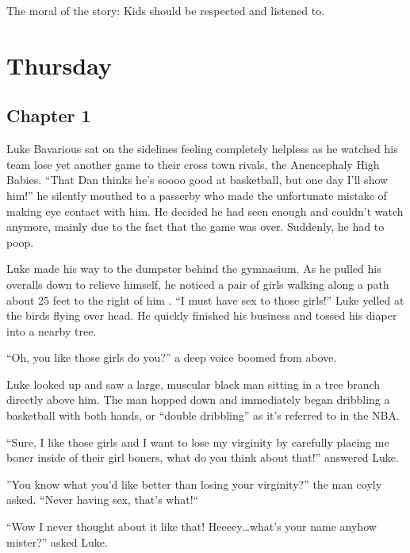 The moral of the story: Kids should be respected and listened
to.



\chapter{Thursday}

\section*{Chapter 1}

Luke Bavarious sat on the sidelines feeling completely helpless as
he watched his team lose yet another game to their cross town
rivals, the Anencephaly High Babies. ``That Dan thinks he's soooo
good at basketball, but one day I'll show him!'' he silently
mouthed to a passerby who made the unfortunate mistake of making
eye contact with him. He decided he had seen enough and couldn't
watch anymore, mainly due to the fact that the game was over.
Suddenly, he had to poop.



Luke made his way to the dumpster behind the gymnasium. As he
pulled his overalls down to relieve himself, he noticed a pair of
girls walking along a path about 25 feet to the right of him . ``I
must have sex to those girls!'' Luke yelled at the birds flying over
head. He quickly finished his business and tossed his diaper into a
nearby tree.



``Oh, you like those girls do you?'' a deep voice boomed from
above.



Luke looked up and saw a large, muscular black man sitting in a
tree branch directly above him. The man hopped down and immediately
began dribbling a basketball with both hands, or ``double dribbling''
as it's referred to in the NBA.



``Sure, I like those girls and I want to lose my virginity by
carefully placing me boner inside of their girl boners, what do you
think about that!'' answered Luke.



''You know what you'd like better than losing your virginity?''
the man coyly asked. ``Never having sex, that's what!``



``Wow I never thought about it like that! Heeeey{\ldots}what's your
name anyhow mister?'' asked Luke.



